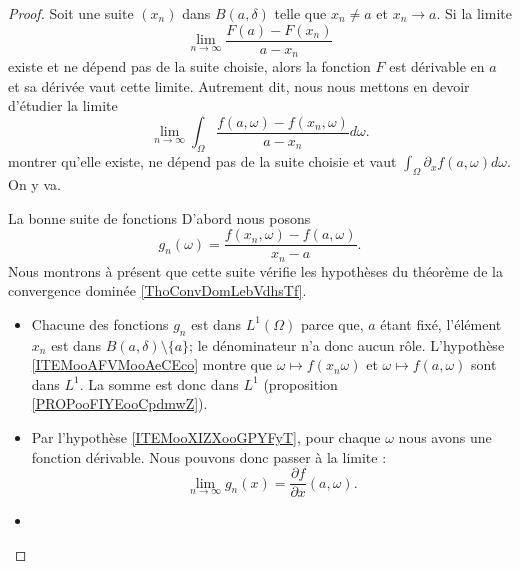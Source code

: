 \begin{proof}
    Soit une suite \( (x_n)\) dans \( B(a,\delta)\) telle que \( x_n\neq a\) et \( x_n\to a\). Si la limite
    \begin{equation}
        \lim_{n\to \infty} \frac{ F(a)-F(x_n) }{ a-x_n }
    \end{equation}
    existe et ne dépend pas de la suite choisie, alors la fonction \( F\) est dérivable en \( a\) et sa dérivée vaut cette limite. Autrement dit, nous nous mettons en devoir d'étudier la limite
    \begin{equation}    \label{EqLIiralx}
        \lim_{n\to \infty} \int_{\Omega}\frac{ f(a,\omega)-f(x_n,\omega) }{ a-x_n }d\omega.
    \end{equation}
    montrer qu'elle existe, ne dépend pas de la suite choisie et vaut \( \int_{\Omega}\partial_xf(a,\omega)d\omega\). On y va.

    \begin{subproof}
        \item[La bonne suite de fonctions]
            D'abord nous posons
            \begin{equation}    \label{EqAFOUbQB}
                g_n(\omega)=\frac{ f(x_n,\omega)-f(a,\omega) }{ x_n-a }.
            \end{equation}
            Nous montrons à présent que cette suite vérifie les hypothèses du théorème de la convergence dominée \ref{ThoConvDomLebVdhsTf}.
            \begin{itemize}
                \item
                    Chacune des fonctions \( g_n\) est dans \( L^1(\Omega)\) parce que, \( a\) étant fixé, l'élément \( x_n\) est dans \( B(a,\delta)\setminus\{ a \}\); le dénominateur n'a donc aucun rôle. L'hypothèse \ref{ITEMooAFVMooAeCEco} montre que \( \omega\mapsto f(x_n\omega)\) et \( \omega\mapsto f(a,\omega)\) sont dans \( L^1\). La somme est donc dans \( L^1\) (proposition \ref{PROPooFIYEooCpdmwZ}).
                \item
                    Par l'hypothèse \ref{ITEMooXIZXooGPYFyT}, pour chaque \( \omega\) nous avons une fonction dérivable. Nous pouvons donc passer à la limite :
                    \begin{equation}
                        \lim_{n\to \infty} g_n(x)=\frac{ \partial f }{ \partial x }(a,\omega).
                    \end{equation}

                \item
            

\end{itemize}
\end{subproof}
\end{proof}
